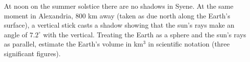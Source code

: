 At noon on the summer solstice there are no shadows in Syene. At the same moment in Alexandria, $800$ km away (taken as due north along the Earth's surface), a vertical stick casts a shadow showing that the sun's rays make an angle of $7.2^\circ$ with the vertical. Treating the Earth as a sphere and the sun's rays as parallel, estimate the Earth's volume in km$^3$ in scientific notation (three significant figures).
